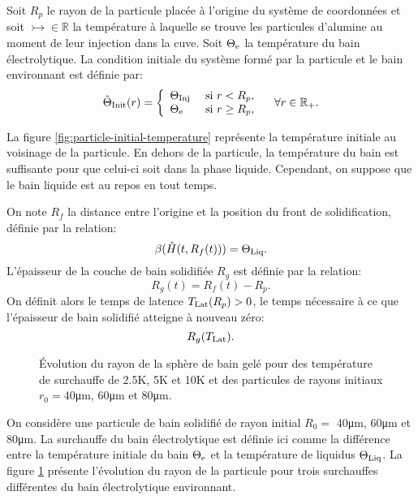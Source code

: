 Soit $R_p$ le rayon de la particule placée à l'origine du système de
coordonnées et soit $\tinj\in\mathbb R$ la température à laquelle se
trouve les particules d'alumine au moment de leur injection dans la
cuve. Soit $\Theta_\mathrm{e}$ la température du bain électrolytique. La
condition initiale du système formé par la particule et le bain
environnant est définie par:
\begin{equation}
  \tilde{\Theta}_\text{Init}(r) = \left\{
  \begin{array}{ll}
    \Theta_\text{Inj} & \text{ si } r < R_p,\\
    \Theta_\mathrm{e} & \text{ si } r \geq R_p,\\
  \end{array}
  \right.\quad \forall r\in \mathbb R_+ .\label{eq:initial-temperature}
\end{equation}

La figure \ref{fig:particle-initial-temperature} représente la
température initiale au voisinage de la particule. En dehors de la
particule, la température du bain est suffisante pour que celui-ci
soit dans la phase liquide. Cependant, on suppose que le bain liquide
est au repos en tout temps.

On note $R_f$ la distance entre l'origine et la position du front de
solidification, définie par la relation:
\begin{equation}
\beta(\tilde{H}(t, R_f(t))) = \Theta_\text{Liq}.
\end{equation}
L'épaisseur de la couche de bain solidifiée $R_g$ est définie par la
relation:
\begin{equation}
R_g(t) = R_f(t) - R_p.
\end{equation}
On définit alors le temps de latence $T_\text{Lat}(R_p) > 0$, le temps
nécessaire à ce que l'épaisseur de bain solidifié atteigne à nouveau
zéro:
\begin{equation}
  R_g(T_\text{Lat}).
\end{equation}

\begin{figure}
\begin{center}
  
  
  
  \caption{Évolution du rayon de la sphère de bain gelé pour des
    température de surchauffe de \num{2.5}\si{\kelvin},
    \num{5}\si{\kelvin} et \num{10}\si{\kelvin} et des particules de
    rayons initiaux $r_0 = $\num{40}\si{\micro\meter},
    \num{60}\si{\micro\meter} et \num{80}\si{\micro\meter}.}
  \label{fig:freeze-radius}
\end{center}
\end{figure}
On considère une particule de bain solidifié de rayon initial $R_0 =$
\num{40}\si{\micro\meter}, \num{60}\si{\micro\meter} et
\num{80}\si{\micro\meter}. La surchauffe du bain électrolytique est
définie ici comme la différence entre la température initiale du bain
$\Theta_\mathrm{e}$ et la température de liquidus $\Theta_\text{Liq}$. La figure
\ref{fig:freeze-radius} présente l'évolution du rayon de la particule
pour trois surchauffes différentes du bain électrolytique environnant.

